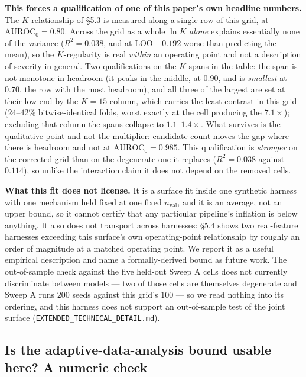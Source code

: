 \documentclass[10pt]{article} %
\begin{document}
\textbf{This forces a qualification of one of this paper's own headline
numbers.} The $K$-relationship of §5.3 is measured along a single row of this
grid, at $\text{AUROC}_0=0.80$. Across the grid as a whole $\ln K$ \emph{alone}
explains essentially none of the variance ($R^2=0.038$, and at LOO $-0.192$
worse than predicting the mean), so the $K$-regularity is real \emph{within} an
operating point and not a description of severity in general. Two
qualifications on the $K$-spans in the table: the span is not monotone in
headroom (it peaks in the middle, at $0.90$, and is \emph{smallest} at $0.70$,
the row with the most headroom), and all three of the largest are set at their
low end by the $K=15$ column, which carries the least contrast in this grid
($24$--$42\%$ bitwise-identical folds, worst exactly at the cell producing the
$7.1\times$); excluding that column the spans collapse to $1.1$--$1.4\times$.
What survives is the qualitative point and not the multiplier: candidate count
moves the gap where there is headroom and not at $\text{AUROC}_0=0.985$. This
qualification is \emph{stronger} on the corrected grid than on the degenerate
one it replaces ($R^2=0.038$ against $0.114$), so unlike the interaction claim
it does not depend on the removed cells.

\textbf{What this fit does not license.} It is a surface fit inside one
synthetic harness with one mechanism held fixed at one fixed $n_{\text{val}}$,
and it is an average, not an upper bound, so it cannot certify that any
particular pipeline's inflation is below anything. It also does not transport
across harnesses: §5.4 shows two real-feature harnesses exceeding this
surface's own operating-point relationship by roughly an order of magnitude at
a matched operating point. We report it as a useful empirical description and
name a formally-derived bound as future work. The out-of-sample check against
the five held-out Sweep A cells does not currently discriminate between models
--- two of those cells are themselves degenerate and Sweep A runs $200$ seeds
against this grid's $100$ --- so we read nothing into its ordering, and this
harness does not support an out-of-sample test of the joint surface
(\texttt{EXTENDED\_TECHNICAL\_DETAIL.md}).

\subsection{Is the adaptive-data-analysis bound usable here? A numeric check}
\label{sec:ada-bound-check}
\end{document}
